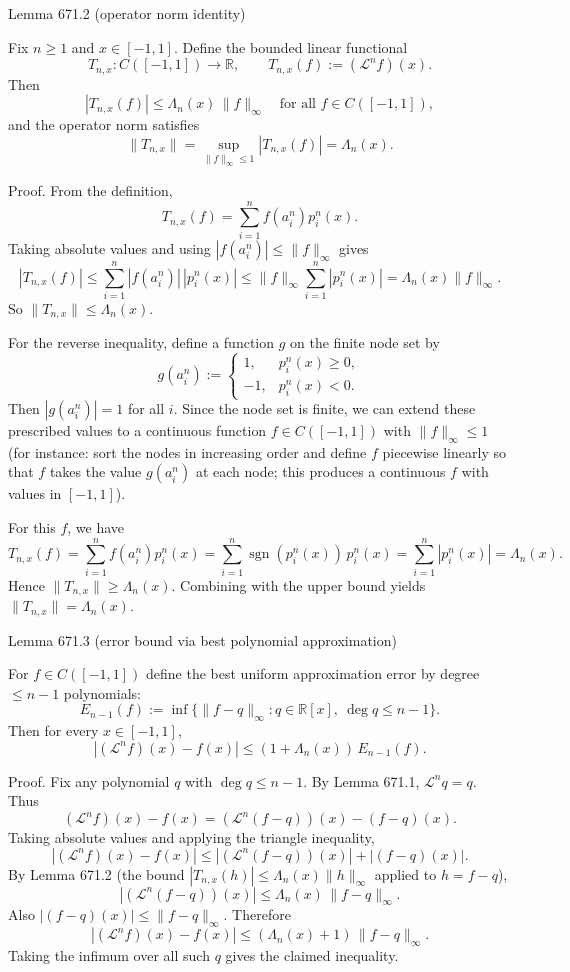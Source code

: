 Lemma 671.2 (operator norm identity)

Fix $n\ge 1$ and $x\in[-1,1]$. Define the bounded linear functional
\[
T_{n,x}:C([-1,1])\to\mathbb R,\qquad T_{n,x}(f):=(\mathcal L^n f)(x).
\]
Then
\[
 |T_{n,x}(f)|\le \Lambda_n(x)\,\|f\|_\infty\quad\text{for all }f\in C([-1,1]),
\]
and the operator norm satisfies
\[
 \|T_{n,x}\|=\sup_{\|f\|_\infty\le 1}|T_{n,x}(f)|=\Lambda_n(x).
\]

Proof.
From the definition,
\[
T_{n,x}(f)=\sum_{i=1}^n f(a_i^n)p_i^n(x).
\]
Taking absolute values and using $|f(a_i^n)|\le\|f\|_\infty$ gives
\[
|T_{n,x}(f)|\le \sum_{i=1}^n |f(a_i^n)|\,|p_i^n(x)|\le \|f\|_\infty\sum_{i=1}^n |p_i^n(x)|=\Lambda_n(x)\|f\|_\infty.
\]
So $\|T_{n,x}\|\le\Lambda_n(x)$.

For the reverse inequality, define a function $g$ on the finite node set by
\[
 g(a_i^n):=\begin{cases}
 1,& p_i^n(x)\ge 0,\\
 -1,& p_i^n(x)<0.
\end{cases}
\]
Then $|g(a_i^n)|=1$ for all $i$. Since the node set is finite, we can extend these prescribed values to a continuous function $f\in C([-1,1])$ with $\|f\|_\infty\le 1$ (for instance: sort the nodes in increasing order and define $f$ piecewise linearly so that $f$ takes the value $g(a_i^n)$ at each node; this produces a continuous $f$ with values in $[-1,1]$).

For this $f$, we have
\[
T_{n,x}(f)=\sum_{i=1}^n f(a_i^n)p_i^n(x)=\sum_{i=1}^n \operatorname{sgn}(p_i^n(x))\,p_i^n(x)=\sum_{i=1}^n |p_i^n(x)|=\Lambda_n(x).
\]
Hence $\|T_{n,x}\|\ge \Lambda_n(x)$. Combining with the upper bound yields $\|T_{n,x}\|=\Lambda_n(x)$.


Lemma 671.3 (error bound via best polynomial approximation)

For $f\in C([-1,1])$ define the best uniform approximation error by degree $\le n-1$ polynomials:
\[
E_{n-1}(f):=\inf\{\|f-q\|_\infty: q\in\mathbb R[x],\ \deg q\le n-1\}.
\]
Then for every $x\in[-1,1]$,
\[
 |(\mathcal L^n f)(x)-f(x)|\le (1+\Lambda_n(x))\,E_{n-1}(f).
\]

Proof.
Fix any polynomial $q$ with $\deg q\le n-1$. By Lemma 671.1, $\mathcal L^n q=q$. Thus
\[
(\mathcal L^n f)(x)-f(x)=(\mathcal L^n (f-q))(x)-(f-q)(x).
\]
Taking absolute values and applying the triangle inequality,
\[
 |(\mathcal L^n f)(x)-f(x)|\le |(\mathcal L^n (f-q))(x)|+|(f-q)(x)|.
\]
By Lemma 671.2 (the bound $|T_{n,x}(h)|\le\Lambda_n(x)\|h\|_\infty$ applied to $h=f-q$),
\[
 |(\mathcal L^n (f-q))(x)|\le\Lambda_n(x)\,\|f-q\|_\infty.
\]
Also $|(f-q)(x)|\le\|f-q\|_\infty$. Therefore
\[
 |(\mathcal L^n f)(x)-f(x)|\le (\Lambda_n(x)+1)\,\|f-q\|_\infty.
\]
Taking the infimum over all such $q$ gives the claimed inequality.


